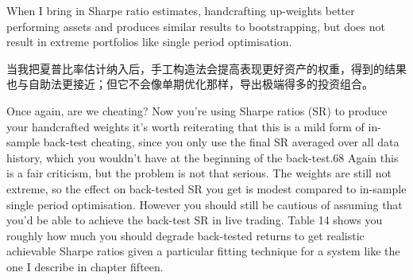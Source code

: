 \begin{chinesetableblock} \begingroup \small \centering
{}
\par \endgroup \end{chinesetableblock}

\begin{englishblock} When I bring in Sharpe ratio estimates, handcrafting up-weights better performing assets and produces similar results to bootstrapping, but does not result in extreme portfolios like single period optimisation. \end{englishblock}

\begin{chineseblock}当我把夏普比率估计纳入后，手工构造法会提高表现更好资产的权重，得到的结果也与自助法更接近；但它不会像单期优化那样，导出极端得多的投资组合。\end{chineseblock}

\bipairgap

\begin{englishblock} Once again, are we cheating? Now you’re using Sharpe ratios (SR) to produce your handcrafted weights it’s worth reiterating that this is a mild form of in-sample back-test cheating, since you only use the final SR averaged over all data history, which you wouldn’t have at the beginning of the back-test.68 Again this is a fair criticism, but the problem is not that serious. The weights are still not extreme, so the effect on back-tested SR you get is modest compared to in-sample single period optimisation. However you should still be cautious of assuming that you’d be able to achieve the back-test SR in live trading. Table 14 shows you roughly how much you should degrade back-tested returns to get realistic achievable Sharpe ratios given a particular fitting technique for a system like the one I describe in chapter fifteen. \end{englishblock}

